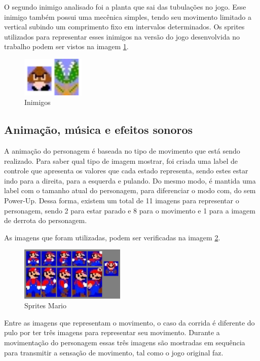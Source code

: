 \documentclass[11pt, twocolumn]{extarticle}
\begin{document}
O segundo inimigo analisado foi a planta que sai das tubulações no jogo. Esse inimigo também possui uma mecênica simples, tendo seu movimento limitado a vertical subindo um comprimento fixo em intervalos determinados. Os sprites utilizados para representar esses inimigos na versão do jogo desenvolvida no trabalho podem ser vistos na imagem \ref{image: Inimigos}.

\begin{figure}[H]
	\centering
	\includegraphics[width=3cm]{figuras/Inimigos.png}
	\caption{Inimigos}
	\label{image: Inimigos}
\end{figure}


\subsection{Animação, música e efeitos sonoros}
\indent \indent A animação do personagem é baseada no tipo de movimento que está sendo realizado. Para saber qual tipo de imagem mostrar, foi criada uma label de controle que apresenta os valores que cada estado representa, sendo estes estar indo para a direita, para a esquerda e pulando. Do mesmo modo, é mantida uma label com o tamanho atual do personagem, para diferenciar o modo com, do sem Power-Up. Dessa forma, existem um total de 11 imagens para representar o personagem, sendo 2 para estar parado e 8 para o movimento e 1 para a imagem de derrota do personagem.

As imagens que foram utilizadas, podem ser verificadas na imagem \ref{image: Sprites Mario}.

\begin{figure}[H]
	\centering
	\includegraphics[width=5cm]{figuras/SpritesMario.png}
	\caption{Sprites Mario}
	\label{image: Sprites Mario}
\end{figure}

Entre as imagens que representam o movimento, o caso da corrida é diferente do pulo por ter três imagens para representar seu movimento. Durante a movimentação do personagem essas três imagens são mostradas em sequência para transmitir a sensação de movimento, tal como o jogo original faz. 
\end{document}
